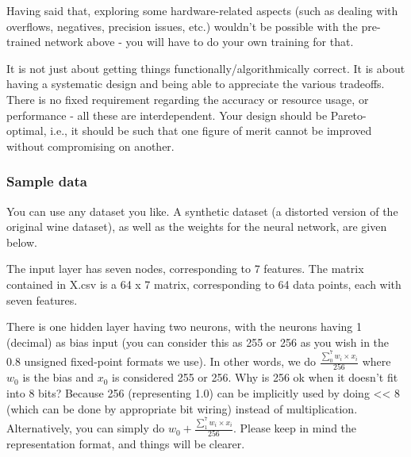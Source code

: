 \documentclass[a4paper,12pt,twoside]{article}
\begin{document}
Having said that, exploring some hardware-related aspects (such as dealing with overflows, negatives, precision issues, etc.) wouldn't be possible with the pre-trained network above - you will have to do your own training for that.

It is not just about getting things functionally/algorithmically correct. It is about having a systematic design and being able to appreciate the various tradeoffs. There is no fixed requirement regarding the accuracy or resource usage, or performance - all these are interdependent. Your design should be Pareto-optimal, i.e., it should be such that one figure of merit cannot be improved without compromising on another.
\subsubsection{Sample data}
You can use any dataset you like. A synthetic dataset (a distorted version of the original wine dataset), as well as the weights for the neural network, are given below.

The input layer has seven nodes, corresponding to 7 features. The matrix contained in X.csv is a 64 x 7 matrix, corresponding to 64 data points, each with seven features.

There is one hidden layer having two neurons, with the neurons having 1 (decimal) as bias input (you can consider this as 255 or 256 as you wish in the 0.8 unsigned fixed-point formats we use). In other words, we do $\frac{\sum_0^7{w_i\times x_i}}{256}$ where $w_0$ is the bias and $x_0$ is considered 255 or 256. Why is 256 ok when it doesn't fit into 8 bits? Because 256 (representing 1.0) can be implicitly used by doing << 8 (which can be done by appropriate bit wiring) instead of multiplication. Alternatively, you can simply do $w_0+\frac{\sum_1^7{w_i\times x_i}}{256}$. Please keep in mind the representation format, and things will be clearer.
\end{document}
